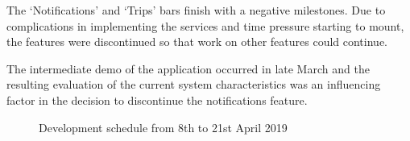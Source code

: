\documentclass{article}
\begin{document}
    The `Notifications' and `Trips' bars finish with a negative milestones. Due to complications in implementing the services and time pressure starting to mount, the features were discontinued so that work on other features could continue. \par
    
    The intermediate demo of the application occurred in late March and the resulting evaluation of the current system characteristics was an influencing factor in the decision to discontinue the notifications feature. \par
    
    \begin{figure}[ht]
        \centering
        \caption{Development schedule from 8th to 21st April 2019}
        \label{fig:ganttchartschedule3}
    \end{figure}


\newpage
\printglossaries


\newpage
\printbibliography
\end{document}
